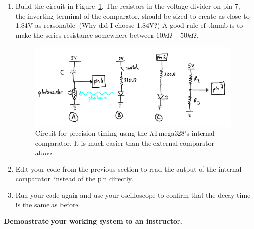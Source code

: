 \documentclass[11pt]{article} %
\begin{document}
\begin{enumerate}
\item Build the circuit in Figure~\ref{fig:comp.internal}. The resistors in the voltage divider on pin 7, the inverting terminal of the comparator, should be sized to create as close to 1.84V as reasonable. (Why did I choose 1.84V?) A good rule-of-thumb is to make the series resistance somewhere between $10k\Omega - 50k\Omega$.

\begin{figure}[htbp]
\begin{center}
\includegraphics[width=\textwidth]{figures/comp_internal}
\caption{Circuit for precision timing using the ATmega328’s internal comparator. It is much easier than the external comparator above.}
\label{fig:comp.internal}
\end{center}
\end{figure}

\item Edit your code from the previous section to read the output of the internal comparator, instead of the pin directly.
\item Run your code again and use your oscilloscope to confirm that the decay time is the same as before.
\end{enumerate}

{\bf Demonstrate your working system to an instructor.}
\end{document}
